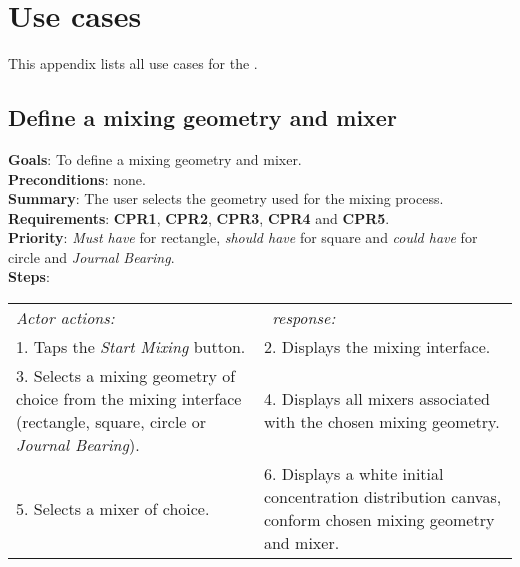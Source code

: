 \chapter{Use cases}
This appendix lists all use cases for the \applicationname.

\section{Define a mixing geometry and mixer}
  \label{geomixer}
  \textbf{Goals}: To define a mixing geometry and mixer.\\
  \textbf{Preconditions}: none.\\
  \textbf{Summary}: The user selects the geometry used for the mixing process.\\
  \textbf{Requirements}: \textbf{CPR1}, \textbf{CPR2}, \textbf{CPR3}, \textbf{CPR4} and \textbf{CPR5}.\\
  \textbf{Priority}: \emph{Must have} for rectangle, \emph{should have} for square and \emph{could have} for circle and \emph{Journal Bearing}.\\
  \textbf{Steps}: \\
  \begin{tabular}{ p{} p{} }
  	\emph{Actor actions:} & \emph{\projectname\ response:} \\
	1. Taps the \emph{Start Mixing} button. & 2. Displays the mixing interface.\\
	3. Selects a mixing geometry of choice from the mixing interface (rectangle, square, circle or \emph{Journal Bearing}). & 4. Displays all mixers associated with the chosen mixing geometry. \\
	5. Selects a mixer of choice. & 6. Displays a white initial concentration distribution canvas, conform chosen mixing geometry and mixer.\\
  \end{tabular}

